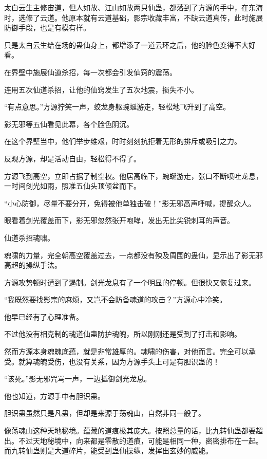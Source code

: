 
\begin{this_body}



太白云生主修宙道，但人如故、江山如故两只仙蛊，都落到了方源的手中，在东海时，选修了云道。他原本就有云道基础，影宗收藏丰富，不缺云道真传，此时施展防御手段，也是有模有样。

只是太白云生给在场的蛊仙身上，都增添了一道云环之后，他的脸色变得不大好看。

在界壁中施展仙道杀招，每一次都会引发仙窍的震荡。

连用五次仙道杀招，让他的仙窍发生了五次地震，损失不小。

“有点意思。”方源狞笑一声，蛟龙身躯蜿蜒游走，轻松地飞升到了高空。

影无邪等五仙看见此幕，各个脸色阴沉。

在这个界壁当中，他们举步维艰，时时刻刻抗拒着无形的排斥或吸引之力。

反观方源，却是活动自由，轻松得不得了。

方源飞到高空，立即占据了制空权。他居高临下，蜿蜒游走，张口不断喷吐龙息，一时间剑光如雨，照准五仙头顶倾盆而下。

“小心防御，尽量不要分开，免得被他单独击破！”影无邪高声呼喊，提醒众人。

眼看着剑光覆盖而下，影无邪忽然张开咆哮，发出无比尖锐刺耳的声音。

仙道杀招魂啸。

魂啸的力量，完全朝高空覆盖过去，一点都没有殃及周围的蛊仙，显示出了影无邪高超的操纵手法。

方源攻势顿时遭到了遏制。剑光龙息有了一个明显的停顿。但很快又恢复过来。

“我既然要找影宗的麻烦，又岂不会防备魂道的攻击？”方源心中冷笑。

他早已经有了心理准备。

不过他没有相克制的魂道仙蛊防护魂魄，所以刚刚还是受到了打击和影响。

然而方源本身魂魄底蕴，就是非常雄厚的。魂啸的伤害，对他而言。完全可以承受。就算魂魄受伤，也没有关系，因为方源手头上可是有胆识蛊的！

“该死。”影无邪咒骂一声，一边抵御剑光龙息。

他也知道，方源手中有胆识蛊。

胆识蛊虽然只是凡蛊，但却是来源于荡魂山，自然非同一般了。

像荡魂山这种天地秘境。蕴藏的道痕极其庞大。按照总量的话，比九转仙蛊都要超出。不过天地秘境中，向来都是零散的道痕，可能是相同一种，密密排布在一起。而九转仙蛊则是大道碎片，能受到蛊仙操纵，发挥出玄妙的威能。


\end{this_body}

